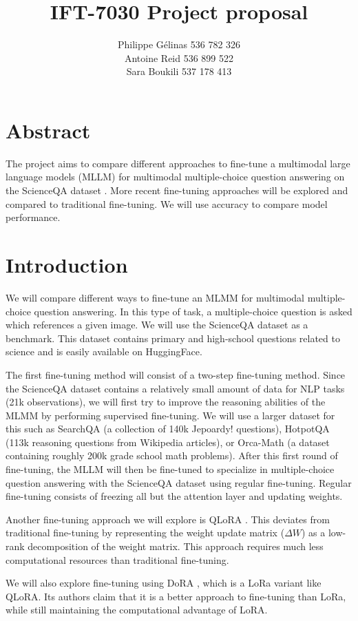\documentclass[11pt]{article} %
\title{\vspace{-2.0cm}IFT-7030 Project proposal}
\author{Philippe Gélinas 536 782 326 \\ Antoine Reid 536 899 522 \\ Sara Boukili 537 178 413}
\date{\vspace{-5ex}} %
\begin{document}
\maketitle

\section*{Abstract}
The project aims to compare different approaches to fine-tune a multimodal large language models (MLLM) for multimodal multiple-choice question answering on the ScienceQA dataset \cite{ScienceQA}. More recent fine-tuning approaches will be explored and compared to traditional fine-tuning. We will use accuracy to compare model performance.

\section*{Introduction}
We will compare different ways to fine-tune an MLMM for multimodal multiple-choice question answering. In this type of task, a multiple-choice question is asked which references a given image. We will use the ScienceQA dataset as a benchmark. This dataset contains primary and high-school questions related to science and is easily available on HuggingFace.

The first fine-tuning method will consist of a two-step fine-tuning method. Since the ScienceQA dataset contains a relatively small amount of data for NLP tasks (21k observations), we will first try to improve the reasoning abilities of the MLMM by performing supervised fine-tuning. We will use a larger dataset for this such as SearchQA (a collection of 140k Jepoardy! questions), HotpotQA (113k reasoning questions from Wikipedia articles), or Orca-Math (a dataset containing roughly 200k grade school math problems). After this first round of fine-tuning, the MLLM will then be fine-tuned to specialize in multiple-choice question answering with the ScienceQA dataset using regular fine-tuning. Regular fine-tuning consists of freezing all but the attention layer and updating weights.

Another fine-tuning approach we will explore is QLoRA \cite{qlora}. This deviates from traditional fine-tuning by representing the weight update matrix ($\Delta W$) as a low-rank decomposition of the weight matrix. This approach requires much less computational resources than traditional fine-tuning.

We will also explore fine-tuning using DoRA \cite{dora}, which is a LoRa \cite{lora} variant like QLoRA. Its authors claim that it is a better approach to fine-tuning than LoRa, while still maintaining the computational advantage of LoRA.
\end{document}
